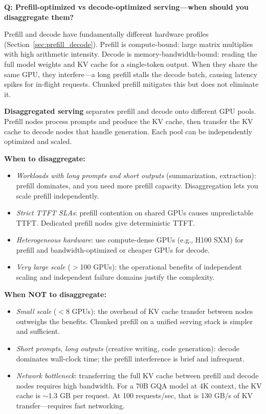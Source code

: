 \begin{interviewq}
\textbf{Q: Prefill-optimized vs decode-optimized serving---when should you disaggregate them?}

 \quad {} \quad \badgefreq{\freqlow}

\stronganswer

Prefill and decode have fundamentally different hardware profiles (Section~\ref{sec:prefill_decode}). Prefill is compute-bound: large matrix multiplies with high arithmetic intensity. Decode is memory-bandwidth-bound: reading the full model weights and KV cache for a single-token output. When they share the same GPU, they interfere---a long prefill stalls the decode batch, causing latency spikes for in-flight requests. Chunked prefill mitigates this but does not eliminate it.

\textbf{Disaggregated serving} separates prefill and decode onto different GPU pools. Prefill nodes process prompts and produce the KV cache, then transfer the KV cache to decode nodes that handle generation. Each pool can be independently optimized and scaled.

\textbf{When to disaggregate:}
\begin{itemize}
    \item \textit{Workloads with long prompts and short outputs} (summarization, extraction): prefill dominates, and you need more prefill capacity. Disaggregation lets you scale prefill independently.
    \item \textit{Strict TTFT SLAs}: prefill contention on shared GPUs causes unpredictable TTFT. Dedicated prefill nodes give deterministic TTFT.
    \item \textit{Heterogeneous hardware}: use compute-dense GPUs (e.g., H100 SXM) for prefill and bandwidth-optimized or cheaper GPUs for decode.
    \item \textit{Very large scale} ($>$100 GPUs): the operational benefits of independent scaling and independent failure domains justify the complexity.
\end{itemize}

\textbf{When NOT to disaggregate:}
\begin{itemize}
    \item \textit{Small scale} ($<$8 GPUs): the overhead of KV cache transfer between nodes outweighs the benefits. Chunked prefill on a unified serving stack is simpler and sufficient.
    \item \textit{Short prompts, long outputs} (creative writing, code generation): decode dominates wall-clock time; the prefill interference is brief and infrequent.
    \item \textit{Network bottleneck}: transferring the full KV cache between prefill and decode nodes requires high bandwidth. For a 70B GQA model at 4K context, the KV cache is $\sim$1.3 GB per request. At 100 requests/sec, that is 130 GB/s of KV transfer---requires fast networking.
\end{itemize}


\end{interviewq}
